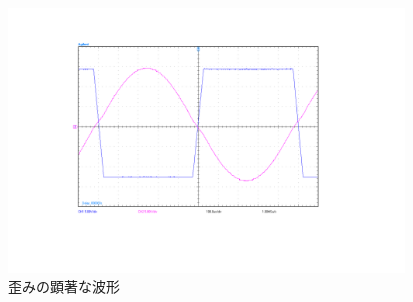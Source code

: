 \documentclass[10pt, a4j, dvipdfmx]{jarticle}
\makeatletter
\newcommand{\figcaption}[1]{\def\@captype{figure}\caption{#1}}
\makeatother
\begin{document}
\begin{figure}[H]
    \centering
    \includegraphics[height=70mm]{Result/Reverse/reverse-Hannten(input_8120mV_output_12200mV).png}
    \figcaption{歪みの顕著な波形}
    \label{fig:7-1-4}
\end{figure}


\newpage
\end{document}
